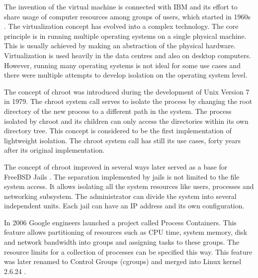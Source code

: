 \documentclass[
  digital, %
  twoside, %
  table,   %
  nolof,   %
  nolot,   %
]{fithesis3}
\begin{document}
The invention of the virtual machine is connected with IBM and its effort to share usage of computer resources among groups of users, which started in 1960s \cite{vm_history}. The virtualization concept has evolved into a complex technology. The core principle is in running multiple operating systems on a single physical machine. This is usually achieved by making an abstraction of the physical hardware. Virtualization is used heavily in the data centres and also on desktop computers. However, running many operating systems is not ideal for some use cases and there were multiple attempts to develop isolation on the operating system level.

The concept of chroot \cite{chroot} was introduced during the development of Unix Version 7 in 1979. The chroot system call serves to isolate the process by changing the root directory of the new process to a different path in the system. The process isolated by chroot and its children can only access the directories within its own directory tree. This concept is considered to be the first implementation of lightweight isolation. The chroot system call has still its use cases, forty years after its original implementation.

The concept of chroot improved in several ways later served as a base for FreeBSD Jails \cite{freebsd_jails}. The separation implemented by jails is not limited to the file system access. It allows isolating all the system resources like users, processes and networking subsystem. The administrator can divide the system into several independent units. Each jail can have an IP address and its own configuration.

In 2006 Google engineers launched a project called Process Containers. This feature allows partitioning of resources such as CPU time, system memory, disk and network bandwidth into groups and assigning tasks to these groups. The resource limits for a collection of processes can be specified this way. This feature was later renamed to Control Groups (cgroups) and merged into Linux kernel 2.6.24 \cite{cgroups}.
\end{document}
